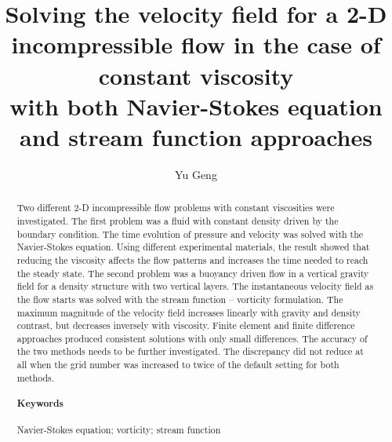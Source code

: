 \documentclass[12pt]{article}
\title{Solving the velocity field for a 2-D incompressible flow in the case of constant viscosity\\with both Navier-Stokes equation and stream function approaches}
\author{Yu Geng}
\date{}
\numberwithin{figure}{section}  %
\numberwithin{equation}{section}  %
\begin{document}
\maketitle
\begin{abstract}
	Two different 2-D incompressible flow problems with constant viscosities were investigated. The first problem was a fluid with constant density driven by the boundary condition. The time evolution of pressure and velocity was solved with the Navier-Stokes equation. Using different experimental materials, the result showed that reducing the viscosity affects the flow patterns and increases the time needed to reach the steady state. The second problem was a buoyancy driven flow in a vertical gravity field for a density structure with two vertical layers. The instantaneous velocity field as the flow starts was solved with the stream function – vorticity formulation. The maximum magnitude of the velocity field increases linearly with gravity and density contrast, but decreases inversely with viscosity. Finite element and finite difference approaches produced consistent solutions with only small differences. The accuracy of the two methods needs to be further investigated. The discrepancy did not reduce at all when the grid number was increased to twice of the default setting for both methods.
	\paragraph{Keywords}Navier-Stokes equation; vorticity; stream function
\end{abstract}
\newpage

\tableofcontents
\newpage
{}
\end{document}
